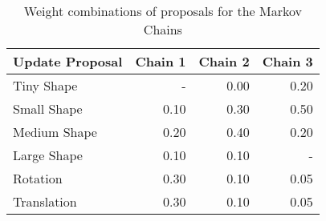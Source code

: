 \begin{table}
  \centering
  \caption{Weight combinations of proposals for the Markov Chains}
  \label{tbl:markovchains}
  \begin{tabular}{lrrr}
    \toprule
      \textbf{Update Proposal} &
      Chain 1 &
      Chain 2 &
      Chain 3 \\
    \midrule
      Tiny Shape & - & 0.00 & 0.20 \\
      Small Shape & 0.10 & 0.30 & 0.50 \\
      Medium Shape & 0.20 & 0.40 & 0.20 \\
      Large Shape & 0.10 & 0.10 & - \\
      Rotation & 0.30 & 0.10 & 0.05 \\
      Translation & 0.30 & 0.10 & 0.05 \\
    \bottomrule
  \end{tabular}
\end{table}
